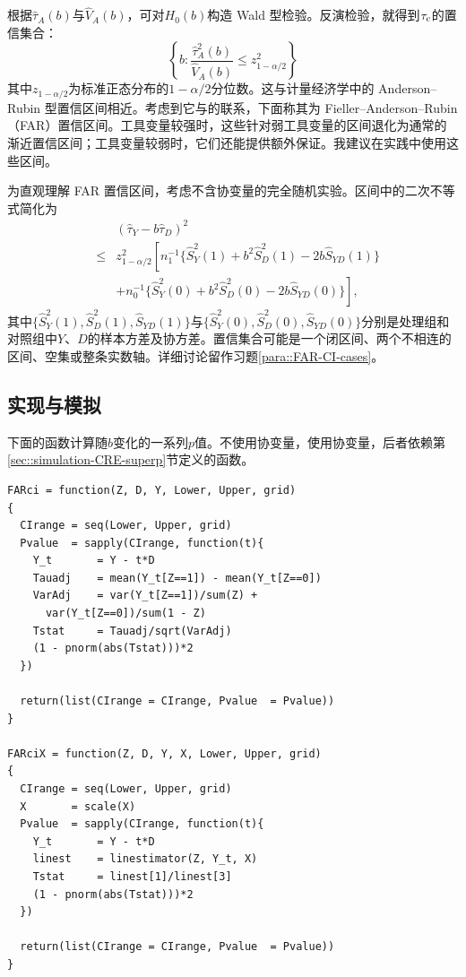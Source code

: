 根据$ \hat{\tau}_A(b)$与$\hat{V}_A( b )$，可对$H_0(b)$构造 Wald 型检验。反演检验，就得到$\tau_{\textup{c}}$的置信集合：
$$
\left\{  b:    \frac{   \hat{\tau}_A^2(b)  }{  \hat{V}_A(b)  } \leq z_{1-\alpha/2}^2 \right\}
$$
其中$z_{1-\alpha/2}$为标准正态分布的$1-\alpha/2$分位数。这与计量经济学中的 Anderson--Rubin 型置信区间\citep{anderson1950asymptotic}相近。考虑到它与\citet{fieller1954some}的联系，下面称其为 Fieller--Anderson--Rubin（FAR）置信区间。工具变量较强时，这些针对弱工具变量的区间退化为通常的渐近置信区间；工具变量较弱时，它们还能提供额外保证。我建议在实践中使用这些区间。 


\begin{example}\label{eg::FAR-CI-noX}
为直观理解 FAR 置信区间，考虑不含协变量的完全随机实验。区间中的二次不等式简化为
\begin{eqnarray*}
&& (\hat{\tau}_Y  - b   \hat{\tau}_D)^2 \\ 
& \leq & z_{1-\alpha/2}^2
\left[      n_1^{-1} \{  \hat{S}_Y^2(1)  + b^2\hat{S}_D^2(1) - 2 b \hat{S}_{YD}(1)  \}  \right. \\
&& \left. 
 + n_0^{-1} \{  \hat{S}_Y^2(0)  + b^2\hat{S}_D^2(0) - 2 b \hat{S}_{YD}(0)  \}    \right] ,
\end{eqnarray*}
其中$\{ \hat{S}_Y^2(1) ,  \hat{S}_D^2(1) , \hat{S}_{YD}(1)  \}$与$ \{ \hat{S}_Y^2(0), \hat{S}_D^2(0),\hat{S}_{YD}(0) \} $分别是处理组和对照组中$Y$、$D$的样本方差及协方差。置信集合可能是一个闭区间、两个不相连的区间、空集或整条实数轴。详细讨论留作习题\ref{para::FAR-CI-cases}。 
\end{example}
 



\subsection{实现与模拟}\label{sec::FARci-simulation}


下面的函数计算随$b$变化的一系列$p$值。不使用协变量，使用协变量，后者依赖第\ref{sec::simulation-CRE-superp}节定义的函数。 

\begin{lstlisting}
FARci = function(Z, D, Y, Lower, Upper, grid)
{
  CIrange = seq(Lower, Upper, grid)
  Pvalue  = sapply(CIrange, function(t){
    Y_t       = Y - t*D
    Tauadj    = mean(Y_t[Z==1]) - mean(Y_t[Z==0])
    VarAdj    = var(Y_t[Z==1])/sum(Z) + 
      var(Y_t[Z==0])/sum(1 - Z)
    Tstat     = Tauadj/sqrt(VarAdj)
    (1 - pnorm(abs(Tstat)))*2
  })
  
  return(list(CIrange = CIrange, Pvalue  = Pvalue))
}

FARciX = function(Z, D, Y, X, Lower, Upper, grid)
{
  CIrange = seq(Lower, Upper, grid)
  X       = scale(X)
  Pvalue  = sapply(CIrange, function(t){
    Y_t       = Y - t*D
    linest    = linestimator(Z, Y_t, X)
    Tstat     = linest[1]/linest[3]
    (1 - pnorm(abs(Tstat)))*2
  })
  
  return(list(CIrange = CIrange, Pvalue  = Pvalue))
}
\end{lstlisting}


